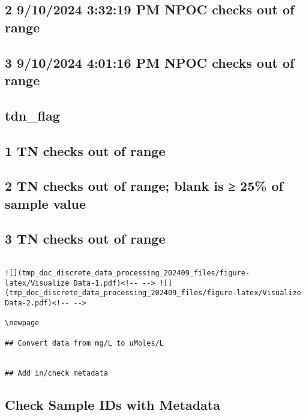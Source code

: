 \documentclass[
]{article}
\begin{document}
\hypertarget{pm-npoc-checks-out-of-range-1}{%
\subsection{2 9/10/2024 3:32:19 PM NPOC checks out of
range}\label{pm-npoc-checks-out-of-range-1}}

\hypertarget{pm-npoc-checks-out-of-range-2}{%
\subsection{3 9/10/2024 4:01:16 PM NPOC checks out of
range}\label{pm-npoc-checks-out-of-range-2}}

\hypertarget{tdn_flag}{%
\subsection{tdn\_flag}\label{tdn_flag}}

\hypertarget{tn-checks-out-of-range}{%
\subsection{1 TN checks out of range}\label{tn-checks-out-of-range}}

\hypertarget{tn-checks-out-of-range-blank-is-25-of-sample-value}{%
\subsection{2 TN checks out of range; blank is ≥ 25\% of sample
value}\label{tn-checks-out-of-range-blank-is-25-of-sample-value}}

\hypertarget{tn-checks-out-of-range-1}{%
\subsection{3 TN checks out of range}\label{tn-checks-out-of-range-1}}

\begin{verbatim}

![](tmp_doc_discrete_data_processing_202409_files/figure-latex/Visualize Data-1.pdf)<!-- --> ![](tmp_doc_discrete_data_processing_202409_files/figure-latex/Visualize Data-2.pdf)<!-- --> 

\newpage

## Convert data from mg/L to uMoles/L 


## Add in/check metadata 
\end{verbatim}

\hypertarget{check-sample-ids-with-metadata}{%
\subsection{Check Sample IDs with
Metadata}\label{check-sample-ids-with-metadata}}
\end{document}

